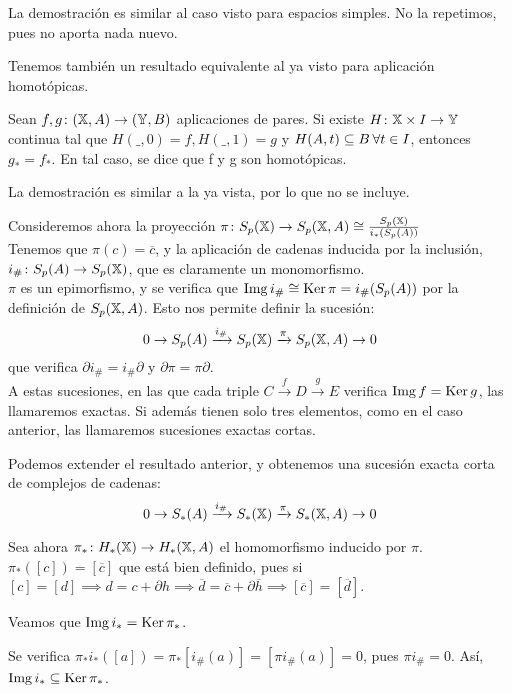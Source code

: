 La demostración es similar al caso visto para espacios simples. No la repetimos, pues no aporta nada nuevo.

Tenemos también un resultado equivalente al ya visto para aplicación homotópicas.

\begin{proposition}
  Sean $f, g \colon ({\mathbb X}, A) \to ({\mathbb Y}, B)$ aplicaciones de pares. Si existe $H \colon {\mathbb X} \times I \to {\mathbb Y}$ continua tal que
  $H(\_, 0) = f, H(\_, 1) = g$ y $H(A, t) \subseteq B \hspace{0.2em} \forall t \in I$, entonces $g_* = f_*$. En tal caso, se dice que
  f y g son homotópicas.
\end{proposition}

La demostración es similar a la ya vista, por lo que no se incluye.

Consideremos ahora la proyección $\pi \colon S_{p}({\mathbb X}) \to S_p({\mathbb X}, A) \cong \frac{S_{p}({\mathbb X})}{i_*(S_p(A))}$ \\
Tenemos que $\pi(c) = \overline{c}$, y la aplicación de cadenas inducida por la inclusión,
$i_\# \colon S_p(A) \to S_{p}({\mathbb X})$, que es claramente un monomorfismo. \\
$\pi$ es un epimorfismo, y se verifica que $\operatorname{Img} i_\# \cong \operatorname{Ker} \pi = i_\#(S_p(A))$ por la definición de $S_p({\mathbb X}, A)$.
Esto nos permite definir la sucesión:
\[0 \to S_p(A) \xrightarrow{i_\#} S_{p}({\mathbb X}) \xrightarrow{\pi} S_p({\mathbb X}, A) \to 0 \]
que verifica $\partial i_\# = i_\# \partial$ y $\partial \pi = \pi \partial$. \\
A estas sucesiones, en las que cada triple $C \xrightarrow{f} D \xrightarrow{g} E$ verifica $\operatorname{Img} f = \operatorname{Ker} g$, las llamaremos exactas.
Si además tienen solo tres elementos, como en el caso anterior, las llamaremos sucesiones exactas cortas.

Podemos extender el resultado anterior, y obtenemos una sucesión exacta corta de complejos de cadenas:
\[0 \to S_*(A) \xrightarrow{i_\#} S_*({\mathbb X}) \xrightarrow{\pi} S_*({\mathbb X}, A) \to 0 \]

Sea ahora $\pi_* \colon H_*({\mathbb X}) \to H_*({\mathbb X}, A)$ el homomorfismo inducido por $\pi$. \\
$\pi_*([c]) = [\overline{c}]$ que está bien definido, pues si $[c] = [d] \implies d = c + \partial h \implies \overline{d} = \overline{c} + \partial \overline{h}
\implies [\overline{c}] = [\overline{d}]$.

Veamos que $\operatorname{Img} i_* = \operatorname{Ker} \pi_*$.

Se verifica $\pi_* i_* ([a]) = \pi_*[i_\#(a)] = [\pi i_\#(a)] = 0$, pues $\pi i_\# = 0$. Así, $\operatorname{Img} i_* \subseteq \operatorname{Ker} \pi_*$.

